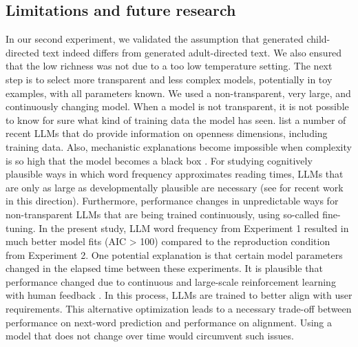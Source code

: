 \documentclass[doc, a4paper]{apa7}
\begin{document}
\subsection*{Limitations and future research}

In our second experiment, we validated the assumption that generated child-directed text indeed differs from generated adult-directed text. We also ensured that the low richness was not due to a too low temperature setting. The next step is to select more transparent and less complex models, potentially in toy examples, with all parameters known. We used a non-transparent, very large, and continuously changing model. When a model is not transparent, it is not possible to know for sure what kind of training data the model has seen. \citet{liesenfeld_opening_2023} list a number of recent LLMs that do provide information on openness dimensions, including training data. Also, mechanistic explanations become impossible when complexity is so high that the model becomes a black box \cite{bender_dangers_2021}. For studying cognitively plausible ways in which word frequency approximates reading times, LLMs that are only as large as developmentally plausible are necessary (see \citep{feng_is_2024, tan_devbench_2024, hu_auxiliary_2024} for recent work in this direction). Furthermore, performance changes in unpredictable ways for non-transparent LLMs that are being trained continuously, using so-called fine-tuning. In the present study, LLM word frequency from Experiment 1 resulted in much better model fits (AIC > 100) compared to the reproduction condition from Experiment 2. One potential explanation is that certain model parameters changed in the elapsed time between these experiments. It is plausible that performance changed due to continuous and large-scale reinforcement learning with human feedback \citep[RLHF][]{bai_training_2022, chung_scaling_2024, perez_red_2022, ziegler_fine-tuning_2020}. In this process, LLMs are trained to better align with user requirements. This alternative optimization leads to a necessary trade-off between performance on next-word prediction and performance on alignment. Using a model that does not change over time would circumvent such issues. 
\end{document}
